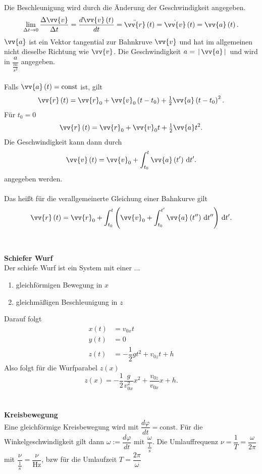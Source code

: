 \documentclass[a4paper,12pt]{article}
\newcommand{\td}{\,\text{d}}
\numberwithin{equation}{section}
\begin{document}
Die Beschleunigung wird durch die Änderung der Geschwindigkeit angegeben.
\[ 
        \lim_{\Delta t\rightarrow 0}\dfrac{\Delta \vv{v}}{\Delta t}=\dfrac{d\vv{v}\left(t\right)}{dt}=\ddot{\vv{r}}\left(t\right)=\dot{\vv{v}}\left(t\right)=\vv{a}\left(t\right)
.\] 
$\vv{a}$ ist ein Vektor tangential zur Bahnkruve $\vv{v}$ und hat im allgemeinen nicht dieselbe Richtung wie $\vv{v}$. Die Geschwindigkeit $a=\,|\, \vv{a}\,|\, $ und wird in $\dfrac{a}{\tfrac{m}{s ^2}}$ angegeben.\\\\
Falls $\vv{a}\left(t\right)=\text{const}$ ist, gilt
\[ 
        \vv{r}\left(t\right)=\vv{r}_0+\vv{v}_0\left(t-t_0\right)+\tfrac{1}{2}\vv{a}\left(t-t_0\right)^2
.\] 
Für $t_0=0$ 
\[ 
\vv{r}\left(t\right)=\vv{r}_0+\vv{v}_0t+\tfrac{1}{2}\vv{a}t^2
.\] 
Die Geschwindigkeit kann dann durch
\[ 
\vv{v}\left(t\right)=\vv{v}_0+\int_{t_0}^{t}\vv{a}\left(t'\right)\td t'
.\] 
angegeben werden.\\\\
Das heißt für die verallgemeinerte Gleichung einer Bahnkurve gilt
\[ 
\vv{r}\left(t\right)=\vv{r}_0+\int_{t_0}^{t}\left(\vv{v}_0+\int_{t_0}^{t'}\vv{a}\left(t''\right)\td t''\right)\td t'
.\] 
\\\hfill\\\textbf{Schiefer Wurf}\\ 
Der schiefe Wurf ist ein System mit einer ...
\begin{enumerate}[label=...]
        \item gleichförmigen Bewegung in $x$ 
        \item gleichmäßigen Beschleunigung in $z$ 
\end{enumerate}
Darauf folgt
\begin{align*}
        x\left(t\right)&=v_{0x}t\\
        y\left(t\right)&=0\\
        z\left(t\right)&=-\dfrac{1}{2}gt^2+v_{0z}t+h
\end{align*}
Also folgt für die Wurfparabel $z\left(x\right)$ 
\[ 
        z\left(x\right)=-\dfrac{1}{2}\dfrac{g}{v_{0x}^2}x^2+\dfrac{v_{0z}}{v_{0x}}x+h
.\] 
\\\hfill\\\textbf{Kreisbewegung}\\ 
Eine gleichförmige Kreisbewegung wird mit $\dfrac{d\varphi }{dt}=\text{const}$. Für die Winkelgeschwindigkeit gilt dann $\omega :=\dfrac{d\varphi }{dt}$ mit $\dfrac{\omega }{\tfrac{1}{\,\text{s}\,}}$. Die Umlauffrequenz $\nu =\dfrac{1}{T}=\dfrac{\omega }{2\pi }$ mit $\dfrac{\nu }{\tfrac{1}{\,\text{s}\,}}=\dfrac{\nu }{\text{Hz}}$, bzw für die Umlaufzeit $T=\dfrac{2\pi }{\omega }$  
\end{document}
